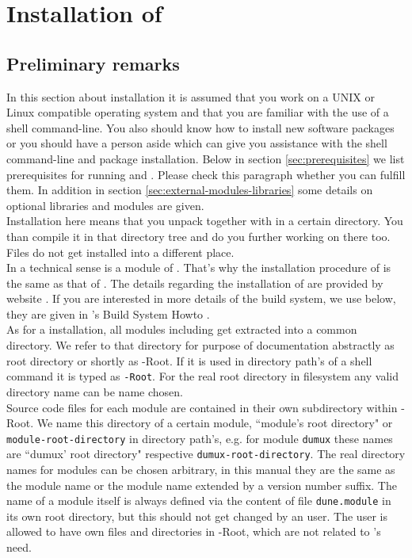 \section{Installation of \Dumux} \label{install}
\subsection{Preliminary remarks}

In this section about installation it is assumed that you work on a UNIX or Linux compatible operating system
and that you are familiar with the use of a shell command-line.  You also should know how to install new software packages
or you should have a person aside which can give you assistance with the shell command-line and package installation. 
Below in section \ref{sec:prerequisites} we list prerequisites for running \Dune and \Dumux. 
Please check this paragraph whether you can fulfill them.
In addition in section \ref{sec:external-modules-libraries} some details on optional libraries and modules are given. \\

Installation here means that you unpack \Dune together with \Dumux in a certain directory.
You than compile it in that directory tree and do you further working on there too. Files do not get installed into a different place.\\

In a technical sense \Dumux is a module of \Dune. 
That's why the installation procedure of \Dumux is the same as that of \Dune. 
The details regarding the installation of \Dune are provided by \Dune website \cite{DUNE-INST}. 
If you are interested in more details of the build system, we use below,
they are given in {\Dune}'s Build System Howto \cite{DUNE-BS}.\\


As for a \Dune installation, all \Dune modules including \Dumux get extracted into a common directory. We refer to that directory for purpose of documentation abstractly as {\Dune} root directory or shortly as {\Dune}-Root. If it is used in directory path's of a shell command it is typed as \texttt{\Dune-Root}. For the real {\Dune} root directory in filesystem any valid directory name can be name chosen.\\

Source code files for each \Dune module are contained in their own subdirectory within {\Dune}-Root.
We name this directory of a certain module, ``module's root directory" or \texttt{module-root-directory} in directory path's,
e.g. for module \texttt{dumux} these names are  ``dumux' root directory" respective \texttt{dumux-root-directory}.
The real directory names for modules can be chosen arbitrary, in this manual they are the same as the
module name or the module name extended by a version number suffix.
The name of a \Dune module itself is always defined via the content of file \texttt{dune.module} in its own root
directory, but this should not get changed by an user. The user is allowed to have own files and directories in \Dune-Root, which are not related to \Dune's need.

